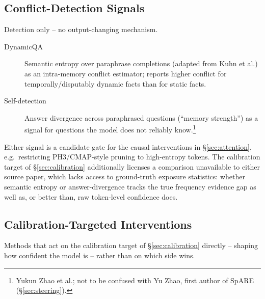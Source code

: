 \documentclass[11pt]{article}
\begin{document}
\subsection{Conflict-Detection Signals}
\label{sec:detection}

Detection only -- no output-changing mechanism.

\begin{description}
  \item[DynamicQA] \citep{marjanovic2024dynamicqa} Semantic entropy over
    paraphrase completions (adapted from Kuhn et al.) as an intra-memory
    conflict estimator; reports higher conflict for temporally/disputably
    dynamic facts than for static facts.
  \item[Self-detection] \citep{zhao2024knowing} Answer divergence across
    paraphrased questions (``memory strength'') as a signal for questions the
    model does not reliably know.\footnote{Yukun Zhao et al.; not to be
    confused with Yu Zhao, first author of SpARE (\S\ref{sec:steering}).}
\end{description}
Either signal is a candidate gate for the causal interventions in
\S\ref{sec:attention}, e.g.\ restricting PH3/CMAP-style pruning to
high-entropy tokens. The calibration target of \S\ref{sec:calibration}
additionally licenses a comparison unavailable to either source paper, which
lacks access to ground-truth exposure statistics: whether semantic entropy or
answer-divergence tracks the true frequency evidence gap as well as, or
better than, raw token-level confidence does.

\subsection{Calibration-Targeted Interventions}
\label{sec:calibration-interventions}

Methods that act on the calibration target of \S\ref{sec:calibration}
directly -- shaping how confident the model is -- rather than on which side
wins.
\end{document}

